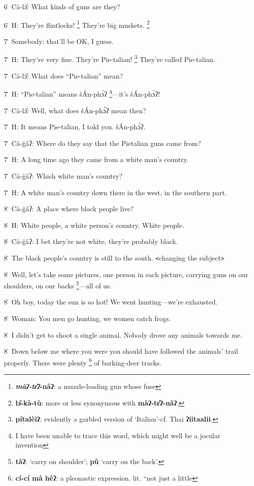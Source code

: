 {6\. Cà-lɔ̂: What kinds of guns are they?

6\. H: They're flintlocks! \footnote{\textbf{\emph{màʔ-tɛ̂ʔ}}\textbf{-nâʔ}: a muzzle-loading gun whose fuse} They're big muskets. \footnote{\textbf{lɔ̂-kà-tù}: more or less synonymous with \textbf{màʔ-tɛ̂ʔ-nâʔ}.}

7\. Somebody: that'll be OK, I guess.

7\. H: They're very fine. They're Pie-talian! \footnote{\textbf{pítalêiʔ}: evidently a garbled version of `Italian'-cf. Thai \textbf{ʔiitaalii}.} They're called Pie-talian.

7\. Cà-lɔ̂: What does ``Pie-talian'' mean?

7\. H: ``Pie-talian'' means šÁn-phɔ̀ʔ \footnote{I have been unable to trace this word, which might well be a jocular invention}---it's šÁn-phɔ̀ʔ!

7\. Cà-lɔ̂: Well, what does šÁn-phɔ̀ʔ mean then?

7\. H: It means Pie-talian, I told you. šÁn-phɔ̀ʔ.

7\. Cà-g̈âʔ: Where do they say that the Pietalian guns came from?

7\. H: A long time ago they came from a white man's country.

7\. Cà-g̈âʔ: Which white man's country?

7\. H: A white man's country down there in the west, in the southern part.

8\. Cà-g̈âʔ: A place where black people live?

8\. H: White people, a white person's country. White people.

8\. Cà-g̈âʔ: I bet they're not white, they're probably black.

8\. The black people's country is still to the south. \texttt{<}changing the subject\texttt{>}

8\. Well, let's take some pictures, one person in each picture, carrying guns on
our shoulders, on our backs \footnote{\textbf{tâʔ}: `carry on shoulder'; \textbf{pû }`carry on the back'.}---all of us.

8\. Oh boy, today the sun is so hot! We went hunting---we're exhausted.

8\. Woman: You men go hunting, we women catch frogs.

8\. I didn't get to shoot a single animal. Nobody drove any animals towards me.

8\. Down below me where you were you should have followed the animals' trail properly.
There were plenty \footnote{\textbf{cí-cí mâ hêʔ}: a pleonastic expression, lit. ``not just a little} of barking-deer tracks.

}
